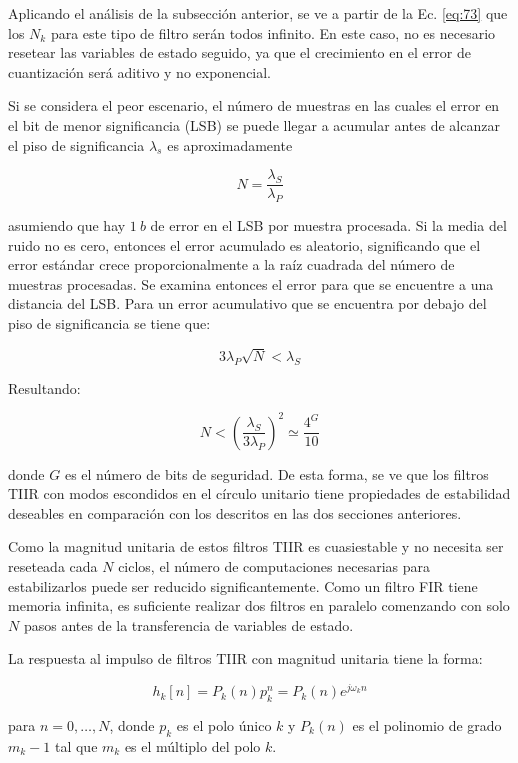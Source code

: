\documentclass[conference]{IEEEtran}
\begin{document}
Aplicando el análisis de la subsección anterior, se ve a partir de la Ec. \ref{eq:73} que los \(N_k\) para este tipo de filtro serán todos infinito. En este caso, no es necesario resetear las variables de estado seguido, ya que el crecimiento en el error de cuantización será aditivo y no exponencial.

Si se considera el peor escenario, el número de muestras en las cuales el error en el bit de menor significancia (LSB) se puede llegar a acumular antes de alcanzar el piso de significancia \(\lambda_s\) es aproximadamente

\begin{equation}
    N = \frac{\lambda_S}{\lambda_P}
\end{equation}

asumiendo que hay \(1 \: b\) de error en el LSB por muestra procesada. Si la media del ruido no es cero, entonces el error acumulado es aleatorio, significando que el error estándar crece proporcionalmente a la raíz cuadrada del número de muestras procesadas. Se examina entonces el error para que se encuentre a una distancia del LSB. Para un error acumulativo que se encuentra por debajo del piso de significancia se tiene que:

\begin{equation}
    3 \lambda_P \sqrt{N} < \lambda_S
\end{equation}

Resultando:

\begin{equation}
    N < \left( \frac{\lambda_S}{3 \lambda_P} \right)^2 \simeq \frac{4^G}{10}
\end{equation}

donde \(G\) es el número de bits de seguridad. De esta forma, se ve que los filtros TIIR con modos escondidos en el círculo unitario tiene propiedades de estabilidad deseables en comparación con los descritos en las dos secciones anteriores.

Como la magnitud unitaria de estos filtros TIIR es cuasiestable y no necesita ser reseteada cada \(N\) ciclos, el número de computaciones necesarias para estabilizarlos puede ser reducido significantemente. Como un filtro FIR tiene memoria infinita, es suficiente realizar dos filtros en paralelo comenzando con solo \(N\) pasos antes de la transferencia de variables de estado.

La respuesta al impulso de filtros TIIR con magnitud unitaria tiene la forma:

\begin{equation}
    h_k[n] = P_k(n) p_k^n = P_k(n) e^{j\omega_k n}
\end{equation}

para \(n=0,\ldots , N\), donde \(p_k\) es el polo único \(k\) y \(P_k(n)\) es el polinomio de grado \(m_k - 1\) tal que \(m_k\) es el múltiplo del polo \(k\).
\end{document}
